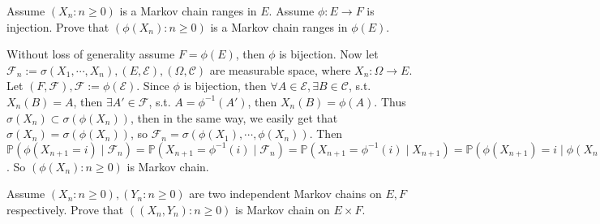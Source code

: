 \documentclass{ctexart}
\begin{document}
\begin{problem}\label{pro:3}
  Assume \((X_n:n \geq 0)\) is a Markov chain ranges in \(E\).
  Assume \(\phi:E \to F\) is injection.
  Prove that \((\phi(X_n):n \geq 0)\) is a Markov chain ranges in \(\phi(E)\).
\end{problem}
\begin{solution}
  Without loss of generality assume \(F=\phi(E)\), then \(\phi\) is bijection.
  Now let \(\mathcal{F}_n:=\sigma(X_1,\cdots,X_n), (E,\mathscr{E}),(\Omega,\mathscr{C})\) are measurable space, where \(X_n:\Omega \to E\).
  Let \((F,\mathscr{F}),\mathscr{F}:=\phi(\mathscr{E})\).
  Since \(\phi\) is bijection, then \(\forall A \in \mathscr{E}, \exists B \in \mathscr{C}\), s.t. \(X_n(B) = A\),
  then \(\exists A' \in \mathscr{F}\), s.t. \(A=\phi^{-1}(A')\), then \(X_n(B)=\phi(A)\).
  Thus \(\sigma(X_n)\subset \sigma(\phi(X_n))\), then in the same way,
  we easily get that \(\sigma(X_n)=\sigma(\phi(X_n))\), so \(\mathcal{F}_n=\sigma(\phi(X_1),\cdots,\phi(X_n))\).
  Then \(\mathbb{P}(\phi(X_{n+1} =i) \mid \mathcal{F}_n)=\mathbb{P}(X_{n+1}=\phi^{-1}(i) \mid \mathcal{F}_n)=\mathbb{P}(X_{n+1}=\phi^{-1}(i) \mid X_{n+1})=\mathbb{P}(\phi(X_{n+1})=i \mid \phi(X_n))\).
  So \((\phi(X_n):n \geq 0)\) is Markov chain.
\end{solution}
\begin{problem}\label{pro:4}
  Assume \((X_n:n \geq 0),(Y_n:n \geq 0)\) are two independent Markov chains on \(E,F\) respectively.
  Prove that \(((X_n,Y_n): n \geq 0)\) is Markov chain on \(E \times F\).
\end{problem}
\end{document}
